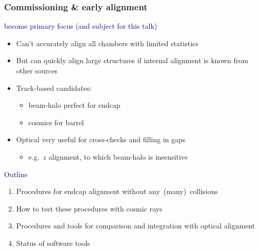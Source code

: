 \documentclass[compress]{beamer}
\begin{document}
\begin{frame}
\frametitle{Commissioning \& early alignment}
\hspace{-0.83 cm} \textcolor{darkblue}{\Large become primary focus (and subject for this talk)}

\begin{itemize}
\item Can't accurately align all chambers with limited statistics
\item But can quickly align large structures if internal alignment is known from other sources
\item Track-based candidates:
\begin{itemize}
\item beam-halo perfect for endcap
\item cosmics for barrel
\end{itemize}
\item Optical very useful for cross-checks and filling in gaps
\begin{itemize}
\item e.g.\ $z$ alignment, to which beam-halo is insensitive
\end{itemize}
\end{itemize}

\hspace{-0.83 cm} \textcolor{darkblue}{\Large Outline}
\begin{enumerate}
\item Procedures for endcap alignment without \mbox{any (many) collisions\hspace{-1 cm}}
\item How to test these procedures with cosmic rays
\item Procedures and tools for comparison and integration with optical alignment
\item Status of software tools
\end{enumerate}
\end{frame}
\end{document}
